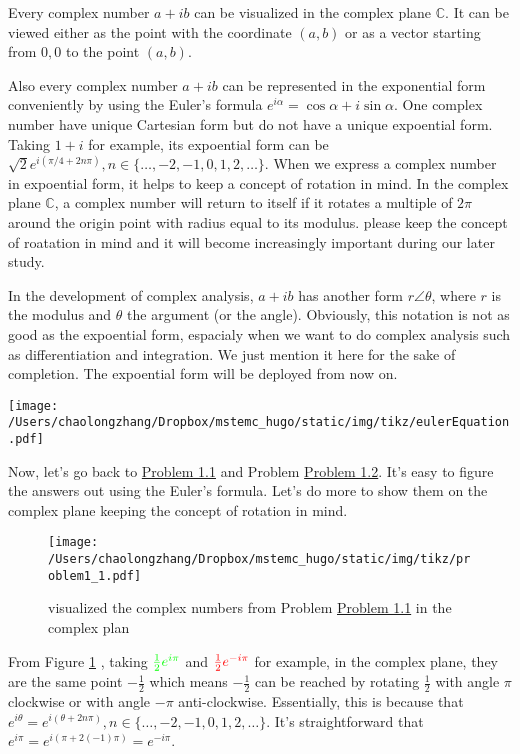 \documentclass[koma,a4paper,utopia,12pt,listings-color,microtype,paralist,colorlinks,urlcolor=red]{org-article}
\begin{document}
Every complex number \(a+ib\) can be visualized in the complex plane
\(\mathbb{C}\). It can be viewed either as the point with the coordinate
\((a,b)\) or as a vector starting from \(0,0\) to the point \((a,b)\).

Also every complex number \(a+ib\) can be represented in the exponential form
conveniently by using the Euler's formula \(e^{i\alpha} = \cos\alpha +
i\sin\alpha\). One complex number have unique Cartesian form but do not have a
unique expoential form. Taking \(1+i\) for example, its expoential form can be
\(\sqrt{2}e^{i(\pi/4 + 2n\pi)}, n\in \{ \ldots, -2,-1,0,1,2,\ldots \}\). When we
express a complex number in expoential form, it helps to keep a concept of
rotation in mind. In the complex plane \(\mathbb{C}\), a complex number will
return to itself if it rotates a multiple of \(2\pi\) around the origin point
with radius equal to its modulus. please keep the concept of roatation in mind
and it will become increasingly important during our later study.

In the development of complex analysis, \(a+ib\) has another form \(r\angle
\theta\), where \(r\) is the modulus and \(\theta\) the argument (or the angle).
Obviously, this notation is not as good as the expoential form, espacialy when
we want to do complex analysis such as differentiation and integration. We just
mention it here for the sake of completion. The expoential form will be deployed
from now on.


\begin{center}
\texttt{[image: /Users/chaolongzhang/Dropbox/mstemc\_hugo/static/img/tikz/eulerEquation.pdf]}
\end{center}

Now, let's go back to \hyperref[prob11]{Problem 1.1} and Problem \hyperref[prob12]{Problem
1.2}. It's easy to figure the answers out using the Euler's formula. Let's do
more to show them on the complex plane keeping the concept of rotation in mind.

\begin{figure}[htbp]
\centering
\texttt{[image: /Users/chaolongzhang/Dropbox/mstemc\_hugo/static/img/tikz/problem1\_1.pdf]}
\caption{\label{problem1-1}
visualized the complex numbers from Problem \hyperref[prob11]{Problem 1.1} in the complex plan}
\end{figure}

From Figure \ref{problem1-1} , taking \(\color{green}{\tfrac{1}{2}e^{i\pi}}\) and
\(\color{red}{\tfrac{1}{2}e^{-i\pi}}\) for example, in the complex plane, they
are the same point \(-\tfrac{1}{2}\) which means \(-\tfrac{1}{2}\) can be
reached by rotating \(\tfrac{1}{2}\) with angle \(\pi\) clockwise or with angle
\(-\pi\) anti-clockwise. Essentially, this is because that \(e^{i\theta} =
e^{i(\theta + 2n\pi)}, n\in \{\ldots,-2,-1,0,1,2,\ldots\}\). It's
straightforward that \(e^{i\pi} = e^{i(\pi + 2(-1)\pi)} = e^{-i\pi}\).
\end{document}
